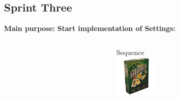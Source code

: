 \subsection{Sprint Three}
\begin{frame}
\textbf{Main purpose:}
\textbf{Start implementation of Settings:}\\
\begin{columns}
\begin{column}{0.5\textwidth}

          \begin{center}
        \end{center}
        \begin{center}
        \end{center}
\end{column}
\begin{column}{0.5\textwidth}
        \begin{center}
         \end{center}
        \begin{center}
                     {Sequence\\
                     \includegraphics[height=2cm]{images/sequence}}
        \end{center}
\end{column}
\end{columns}
\end{frame}

